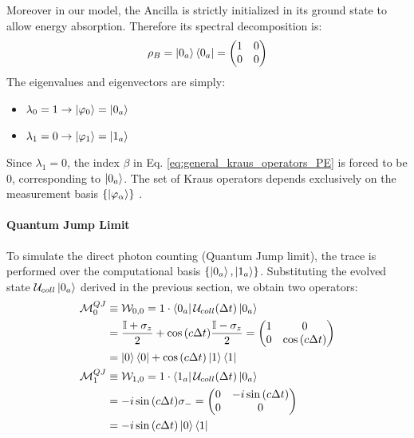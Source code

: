 \documentclass[a4paper,12pt]{article}
\begin{document}
Moreover in our model, the Ancilla is strictly initialized in its ground state to allow energy absorption. Therefore its spectral decomposition is:
\begin{equation}
	\rho_B = \ket{0_a}\bra{0_a} =
	\begin{pmatrix}
		1 & 0 \\
		0 & 0
	\end{pmatrix}
\end{equation}
The eigenvalues and eigenvectors are simply:
\begin{itemize}
	\item $\lambda_0 = 1 \rightarrow \ket{\varphi_0} = \ket{0_a} $
	\item $\lambda_1 = 0 \rightarrow \ket{\varphi_1} = \ket{1_a} $
\end{itemize}

Since $ \lambda_1 = 0 $, the index $ \beta $ in Eq. \ref{eq:general_kraus_operators_PE} is forced to be $ 0 $, corresponding to $ \ket{0_a} $. The set of Kraus operators depends exclusively on the measurement basis $ \{ \ket{\varphi_{\alpha}} \} $ .

\paragraph{Quantum Jump Limit}
To simulate the direct photon counting (Quantum Jump limit), the trace is performed over the computational basis $ \{ \ket{0_{a}}, \ket{1_{a}} \} $. Substituting the evolved state $ \mathcal{U}_{coll} \ket{0_a} $ derived in the previous section, we obtain two operators:
\begin{align}
	\mathcal{M}_{0}^{QJ} &\equiv \mathcal{W}_{0, 0} = 1 \cdot \bra{0_a} \mathcal{U}_{coll}(\Delta t) \ket{0_a} \notag \\
	&= \frac{\mathbb{I} + \sigma_{z}}{2} + \cos{\left(c \Delta t \right)} \frac{\mathbb{I} - \sigma_{z}}{2} = 
	\begin{pmatrix} 1 & 0 \\ 0 & \cos{\left(c \Delta t \right)} \end{pmatrix} \notag \\
	&= \ket{0}\bra{0} + \cos \left(c \Delta t\right) \ket{1} \bra{1} \\
	\mathcal{M}_{1}^{QJ} &\equiv \mathcal{W}_{1, 0} = 1 \cdot \bra{1_a} \mathcal{U}_{coll}(\Delta t) \ket{0_a} \notag \\
	&= - i \sin{\left(c \Delta t \right)} \sigma_{-} = 
	\begin{pmatrix} 0 & -i \sin{\left(c \Delta t \right)} \\ 0 & 0 \end{pmatrix} \notag \\
	&= - i \sin{\left(c \Delta t \right)} \ket{0}\bra{1} 
\end{align}
\end{document}
